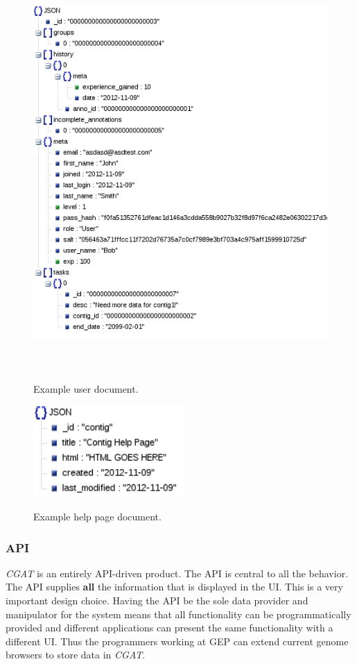 \documentclass[12pt]{ucthesis}
\newcommand{\captionfonts}{\small\bf\ssp}
\begin{document}
\begin{figure}[H]
\begin{center}
\includegraphics[height=150mm]{user.png}
\captionfonts
\caption[User Document]{Example user document.}
\label{fig:user-ex}
\end{center}
\end{figure}

\begin{figure}[H]
\begin{center}
\includegraphics[height=35mm]{help.png}
\captionfonts
\caption[Help Page Document]{Example help page document.}
\label{fig:help-ex}
\end{center}
\end{figure}


\subsubsection{API}
\textit{CGAT} is an entirely API-driven product. The API is central to all the behavior.
The API supplies \textbf{all} the information that is displayed in the UI.
This is a very important design choice. Having the API be the sole data provider and manipulator for the system
means that all functionality can be programmatically provided and different applications can present the same
functionality with a different UI. Thus the programmers working at GEP can extend current genome browsers to store data in \textit{CGAT}.
\end{document}

